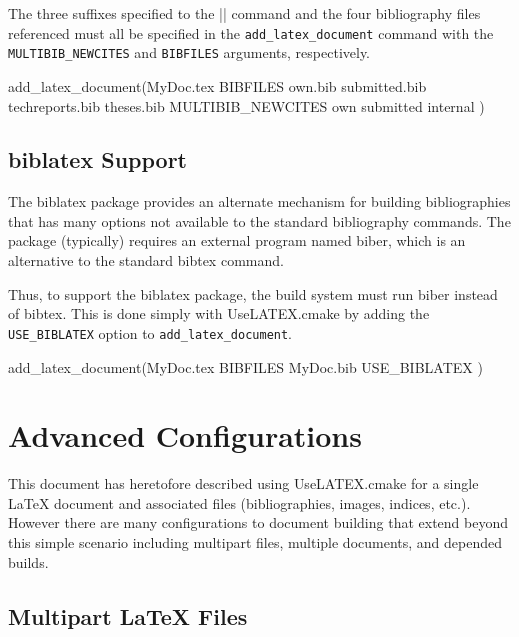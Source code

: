 \documentclass{article}
\newcommand*{\textfile}[1]{\textsf{#1}}
\newcommand*{\textprog}[1]{\textfile{#1}}
\newcommand*{\textlatexpackage}[1]{\textsf{#1}}
\newcommand*{\textcmake}[1]{\texttt{#1}}
\newcommand*{\UseLATEX}{\textfile{UseLATEX.cmake}\xspace}
\newcommand*{\latex}{\LaTeX\xspace}
\newcommand*{\ald}{\textcmake{add\_latex\_document}\xspace}
\begin{document}
  The three suffixes specified to the \textlatex|\newcite| command and the
  four bibliography files referenced must all be specified in the \ald
  command with the \textcmake{MULTIBIB\_NEWCITES} and \textcmake{BIBFILES}
  arguments, respectively.

  \begin{CodeListing}
add_latex_document(MyDoc.tex
  BIBFILES own.bib submitted.bib techreports.bib theses.bib
  MULTIBIB_NEWCITES own submitted internal
  )
  \end{CodeListing}

  \subsection{\textlatexpackage{biblatex} Support}
  \label{sec:biblatexSupport}

  The \textlatexpackage{biblatex} package provides an alternate mechanism
  for building bibliographies that has many options not available to the
  standard bibliography commands. The package (typically) requires an
  external program named \textprog{biber}, which is an alternative to the
  standard \textprog{bibtex} command.

  Thus, to support the \textlatexpackage{biblatex} package, the build
  system must run \textprog{biber} instead of \textprog{bibtex}. This is
  done simply with \UseLATEX by adding the \textcmake{USE\_BIBLATEX} option
  to \ald.

  \begin{CodeListing}
add_latex_document(MyDoc.tex
  BIBFILES MyDoc.bib
  USE_BIBLATEX
  )
  \end{CodeListing}



  \section{Advanced Configurations}
  \label{sec:AdvancedConfigurations}

  This document has heretofore described using \UseLATEX for a single
  \latex document and associated files (bibliographies, images, indices,
  etc.).  However there are many configurations to document building that
  extend beyond this simple scenario including multipart files, multiple
  documents, and depended builds.

  \subsection{Multipart \latex Files}
  \label{sec:MultipartLatexFiles}
\end{document}
